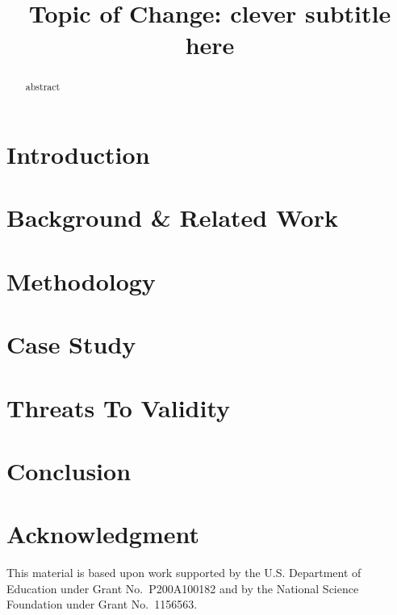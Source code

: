\documentclass[conference]{IEEEtran}
\begin{document}
\title{Topic of Change: clever subtitle here}
\author{
}

\maketitle

\begin{abstract}

    abstract

\end{abstract}

\begin{IEEEkeywords}
\end{IEEEkeywords}

\section{Introduction}
\label{sec:intro}


\section{Background \& Related Work}
\label{sec:related}


\section{Methodology}
\label{sec:methodology}


\section{Case Study}
\label{sec:study}


\section{Threats To Validity}
\label{sec:threats}


\section{Conclusion}
\label{sec:conclusion}


\section*{Acknowledgment}
This material is based upon work supported
by the U.S. Department of Education under Grant No.\ P200A100182 and
by the National Science Foundation under Grant No.\ 1156563.



\end{document}
